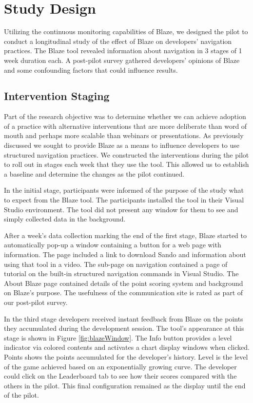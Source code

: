 \documentclass{sig-alternate}
\begin{document}
\section {Study Design}

Utilizing the continuous monitoring capabilities of Blaze, we designed the pilot to conduct a longitudinal study of the effect of Blaze on developers' navigation practices.  The Blaze tool revealed information about navigation in 3 stages of 1 week duration each.  A post-pilot survey gathered developers' opinions of Blaze and some confounding factors that could influence results.

\subsection{Intervention Staging}

Part of the research objective was to determine whether we can achieve adoption of a practice with alternative interventions that are more deliberate than word of mouth and perhaps more scalable than webinars or presentations.  As previously discussed we sought to provide Blaze as a means to influence developers to use structured navigation practices.  We constructed the interventions during the pilot to roll out in stages each week that they use the tool.  This allowed us to establish a baseline and determine the changes as the pilot continued.

In the initial stage, participants were informed of the purpose of the study what to expect from the Blaze tool.  The participants installed the tool in their Visual Studio environment.  The tool did not present any window for them to see and simply collected data in the background.   

After a week's data collection marking the end of the first stage, Blaze started to automatically pop-up a window containing a button for a web page with information.  The page included a link to download Sando  and information about using that tool in a video.  The sub-page on navigation contained a page of tutorial on the built-in structured navigation commands in Visual Studio.  The About Blaze page contained details of the point scoring system and background on Blaze's purpose.  The usefulness of the communication site is rated as part of our post-pilot  survey.

In the third stage developers received instant feedback from Blaze on the points they accumulated during the development session.  The tool's appearance at this stage is shown in Figure \ref{fig:blazeWindow}.  The Info button provides a level indicator via colored contents and activates a chart display windows when clicked.  Points shows the points accumulated for the developer's history.  Level is the level of the game achieved based on an exponentially growing curve.   The developer could click on the Leaderboard tab to see how their scores compared with the others in the pilot.  This final configuration remained as the display until the end of the pilot.  
\end{document}
